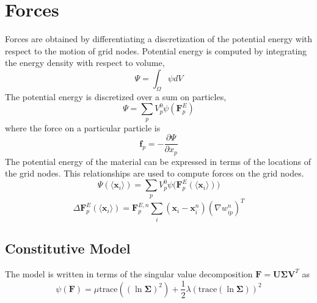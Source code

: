 \documentclass{scrartcl}
\theoremstyle{definition}
\begin{document}
\section{Forces}
Forces are obtained by differentiating a discretization of the potential energy with respect to the motion of grid nodes. Potential energy is computed by integrating the energy density with respect to volume,
\begin{equation*}
\Psi = \int_\Omega{\psi dV}
\end{equation*}
The potential energy is discretized over a sum on particles,
\begin{equation*}
\Psi = \sum_p{V_p^0\psi(\textbf{F}_p^E)}
\end{equation*}
where the force on a particular particle is
\begin{equation*}
\textbf{f}_p = -\frac{\partial \Psi}{\partial x_p}
\end{equation*}
The potential energy of the material can be expressed in terms of the locations of the grid nodes. This relationships are used to compute forces on the grid nodes.
\begin{equation*}
\Psi(\langle \textbf{x}_i\rangle) = \sum_p{V_p^0\psi\big(\textbf{F}_p^E(\langle \textbf{x}_i\rangle)\big)}
\end{equation*}
\begin{equation*}
\Delta \textbf{F}_p^E(\langle \textbf{x}_i\rangle) = \textbf{F}_p^{E,n}\sum_i{(\textbf{x}_i - \textbf{x}_i^n)(\nabla w_{ip}^n)^T}
\end{equation*}

\subsection{Constitutive Model}
The model is written in terms of the singular value decomposition $\textbf{F} = \textbf{U}\mathbf{\Sigma}\textbf{V}^T$ as
\begin{equation*}
\psi(\textbf{F}) = \mu \text{trace}((\ln\mathbf{\Sigma})^2) + \frac{1}{2}\lambda(\text{trace}(\ln{\mathbf{\Sigma}}))^2
\end{equation*}
\end{document}
